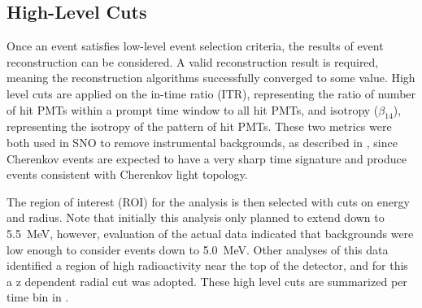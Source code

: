 \subsection{High-Level Cuts}

Once an event satisfies low-level event selection criteria, the results of event reconstruction can be considered.
A valid reconstruction result is required, meaning the reconstruction algorithms successfully converged to some value.
High level cuts are applied on the in-time ratio (ITR), representing the ratio of number of hit PMTs within a prompt time window to all hit PMTs, and isotropy ($\beta_{14}$), representing the isotropy of the pattern of hit PMTs.
These two metrics were both used in SNO to remove instrumental backgrounds, as described in , since Cherenkov events are expected to have a very sharp time signature and produce events consistent with Cherenkov light topology.

The region of interest (ROI) for the analysis is then selected with cuts on energy and radius.
Note that initially this analysis only planned to extend down to 5.5~MeV, however, evaluation of the actual data indicated that backgrounds were low enough to consider events down to 5.0~MeV.
Other analyses of this data identified a region of high radioactivity near the top of the detector, and for this a z dependent radial cut was adopted.
These high level cuts are summarized per time bin in .

